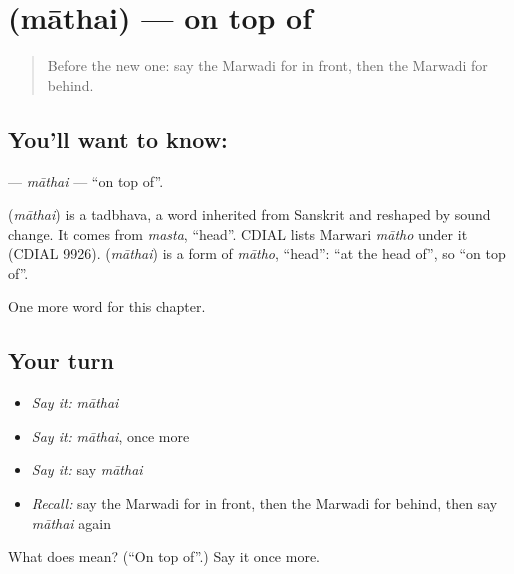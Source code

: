 \section[\texorpdfstring{\mw{माथै} (māthai)}{माथै (māthai)}]{ (māthai) — on top of}

\label{lesson:MW-C96-mathai}



\begin{quote}
Before the new one: say the Marwadi for in front, then the Marwadi for behind.
\end{quote}

\subsection*{You'll want to know: }
\textbf{} — \emph{māthai} — \textquotedblleft{}on top of\textquotedblright{}.

\begin{cousinweb}
\textbf{} (\emph{māthai}) is a tadbhava, a word inherited from Sanskrit and reshaped by sound change. It comes from \emph{masta}, \textquotedblleft{}head\textquotedblright{}. CDIAL lists Marwari \emph{mātho} under it (CDIAL 9926). \textbf{} (\emph{māthai}) is a form of \emph{mātho}, \textquotedblleft{}head\textquotedblright{}: \textquotedblleft{}at the head of\textquotedblright{}, so \textquotedblleft{}on top of\textquotedblright{}.
\end{cousinweb}

\begin{grammarlens}[title={What you've built}]
One more word for this chapter.
\end{grammarlens}

\subsection*{Your turn}
\begin{itemize}
\raggedright
  \item \emph{Say it:} \emph{māthai}
  \item \emph{Say it:} \emph{māthai}, once more
  \item \emph{Say it:} say \emph{māthai}
  \item \emph{Recall:} say the Marwadi for in front, then the Marwadi for behind, then say \emph{māthai} again
\end{itemize}

\begin{tcolorbox}[breakable,colback=teal!4,colframe=teal!35!black,title={Before you move on}]
What does  mean? (\textquotedblleft{}On top of\textquotedblright{}.) Say it once more.
\end{tcolorbox}
